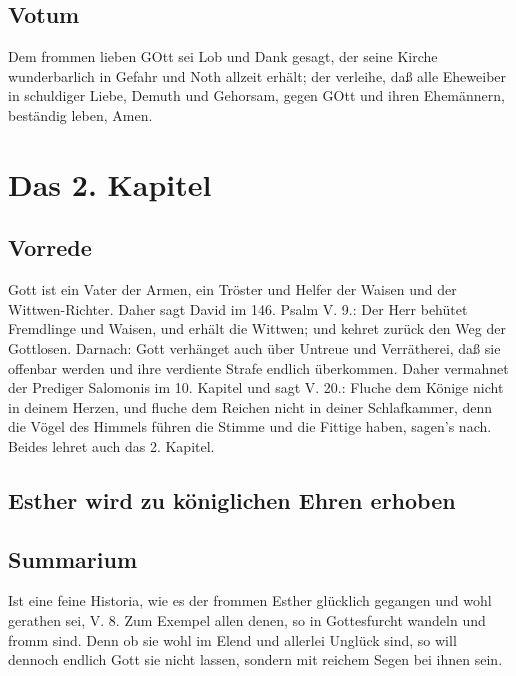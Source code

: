 
\section{Votum}

Dem frommen lieben GOtt sei Lob und Dank gesagt, der seine Kirche wunderbarlich in Gefahr und Noth allzeit erhält; der verleihe, daß alle Eheweiber in schuldiger Liebe, Demuth und Gehorsam, gegen GOtt und ihren Ehemännern, beständig leben, Amen.

\chapter{Das 2. Kapitel}

\section{Vorrede}

Gott ist ein Vater der Armen, ein Tröster und Helfer der Waisen und der Wittwen-Richter. Daher sagt David im 146. Psalm V. 9.: Der Herr behütet Fremdlinge und Waisen, und erhält die Wittwen; und kehret zurück den Weg der Gottlosen. Darnach: Gott verhänget auch über Untreue und Verrätherei, daß sie offenbar werden und ihre verdiente Strafe endlich überkommen. Daher vermahnet der Prediger Salomonis im 10. Kapitel und sagt V. 20.: Fluche dem Könige nicht in deinem Herzen, und fluche dem Reichen nicht in deiner Schlafkammer, denn die Vögel des Himmels führen die Stimme und die Fittige haben, sagen's nach. Beides lehret auch das 2. Kapitel.

\section{Esther wird zu königlichen Ehren erhoben}


\section{Summarium}

Ist eine feine Historia, wie es der frommen Esther glücklich gegangen und wohl gerathen sei, V. 8. Zum Exempel allen denen, so in Gottesfurcht wandeln und fromm sind. Denn ob sie wohl im Elend und allerlei Unglück sind, so will dennoch endlich Gott sie nicht lassen, sondern mit reichem Segen bei ihnen sein.

